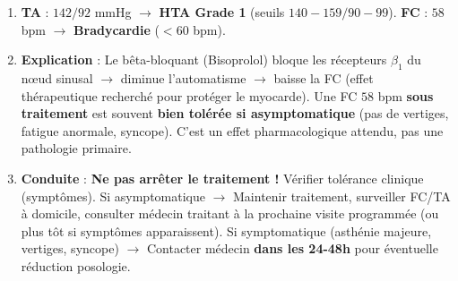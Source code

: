 \documentclass[11pt]{article}
\begin{document}
\begin{corrige}[Exercice 1]
\begin{enumerate}
    \item \textbf{TA} : $142/92$ mmHg $\rightarrow$ \textbf{HTA Grade 1} (seuils $140-159 / 90-99$). \textbf{FC} : $58$ bpm $\rightarrow$ \textbf{Bradycardie} ($< 60$ bpm).
    \item \textbf{Explication} : Le bêta-bloquant (Bisoprolol) bloque les récepteurs $\beta_1$ du nœud sinusal $\rightarrow$ diminue l'automatisme $\rightarrow$ baisse la FC (effet thérapeutique recherché pour protéger le myocarde). Une FC $58$ bpm \textbf{sous traitement} est souvent \textbf{bien tolérée si asymptomatique} (pas de vertiges, fatigue anormale, syncope). C'est un effet pharmacologique attendu, pas une pathologie primaire.
    \item \textbf{Conduite} : \textbf{Ne pas arrêter le traitement !} Vérifier tolérance clinique (symptômes). Si asymptomatique $\rightarrow$ Maintenir traitement, surveiller FC/TA à domicile, consulter médecin traitant à la prochaine visite programmée (ou plus tôt si symptômes apparaissent). Si symptomatique (asthénie majeure, vertiges, syncope) $\rightarrow$ Contacter médecin \textbf{dans les 24-48h} pour éventuelle réduction posologie.
\end{enumerate}
\end{corrige}
\end{document}
